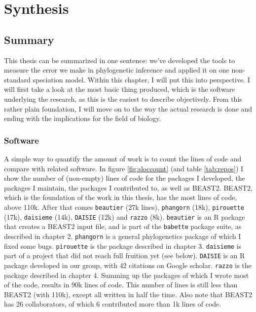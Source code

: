 \chapter{Synthesis}
\label{synthesis}
\newpage

\noindent

\section{Summary}

This thesis can be summarized in one sentence:
we've developed the tools to measure the
error we make in phylogenetic inference and
applied it on one non-standard speciation model.
Within this chapter, I will put this into perspective.
I will first take a look at the most basic thing produced,
which is the software underlying the research,
as this is the easiest to describe objectively. 
From this rather plain foundation, I will move on 
to the way the actual research is done and ending
with the implications for the field of biology.

\subsection{Software}

A simple way to quantify the amount of work
is to count the lines of code and compare with related
software. In figure \ref{fig:sloccount} (and table \ref{tab:repos})
I show the number of
(non-empty) lines of code for the packages I developed, the packages
I maintain, the packages I contributed to, as well as BEAST2.
BEAST2, which is the foundation of the work in this thesis, 
has the most lines of code, above 110k. After that comes
\verb;beautier; (27k lines), \verb;phangorn; (18k), 
\verb;pirouette; (17k), \verb;daisieme; (14k), 
\verb;DAISIE; (12k) and \verb;razzo; (8k). 
\verb;beautier; is an R package that creates a BEAST2 
input file, and is part of the \verb;babette; package suite, as described
in chapter 2. 
\verb;phangorn; is a general phylogenetics package of which I fixed some bugs.
\verb;pirouette; is the package described in chapter 3. 
\verb;daisieme; is part of a project that did not reach full fruition yet (see below).
\verb;DAISIE; is an R package developed in our group, with 42 citations on
Google scholar. \verb;razzo; is the package described in chapter 4.
Summing up the packages of which I wrote most of the code, results
in 90k lines of code. This number of lines is still less than 
BEAST2 (with 110k), except all written in half the time. Also note that
BEAST2 has 26 collaborators, of which 6 contributed more than 1k lines of code.

